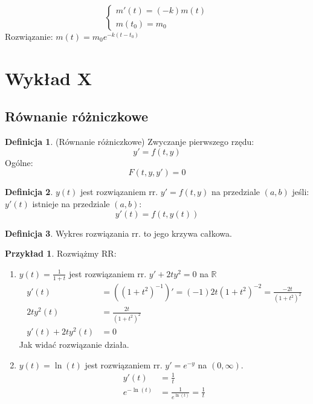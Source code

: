 \documentclass{article}
\theoremstyle{definition}
\newtheorem{de}{Definicja}[subsection]
\theoremstyle{definition}
\theoremstyle{definition}
\newtheorem{pk}{Przykład}[subsection]
\theoremstyle{definition}
\begin{document}
$$\begin{cases}
    m'(t)=(-k)m(t)\\
    m(t_0)=m_0
\end{cases}$$
Rozwiązanie:
$m(t)=m_0 e^{-k(t-t_0)}$

\section{Wykład X}

\subsection{Równanie różniczkowe}

\begin{de}
    (Równanie różniczkowe) Zwyczanje pierwszego rzędu:
    \[y' = f(t,y)\]
    Ogólne:
    \[F(t,y,y')=0\]
\end{de}

\begin{de}
    $y(t)$ jest rozwiązaniem rr. $y'=f(t,y)$ na przedziale $(a,b)$ jeśli:
    $y'(t)$ istnieje na przedziale $(a,b)$:
    \[y'(t)=f(t,y(t))\]
\end{de}

\begin{de}
    Wykres rozwiązania rr. to jego krzywa całkowa.
\end{de}

\begin{pk}
    Rozwiążmy RR:
    \begin{enumerate}
        \item $y(t) = \frac{1}{1+t}$ jest rozwiązaniem rr. $y' + 2ty^2 = 0$ na $\mathbb{R}$
        \begin{align}
            y'(t) &= ((1+t^2)^{-1})' = (-1)2t (1+t^2)^{-2} = \frac{-2t}{(1+t^2)^2}\\
            2t y^2(t) &= \frac{2t}{(1+t^2)^2}\\
            y'(t) + 2ty^2(t) &= 0
        \end{align}
        Jak widać rozwiązanie działa.
        \item $y(t)=\ln(t)$ jest rozwiązaniem rr. $y'=e^{-y}$ na $(0,\infty)$.
        \begin{align}
            y'(t) &= \frac{1}{t}\\
            e^{-\ln(t)} &= \frac{1}{e^{\ln(t)}} = \frac{1}{t}
        \end{align}
    \end{enumerate}
\end{pk}
\end{document}
